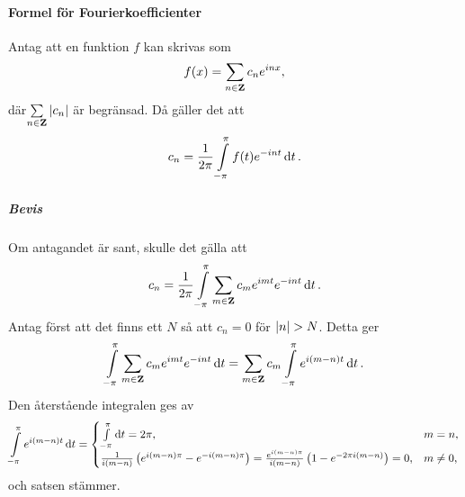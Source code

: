 \paragraph{Formel för Fourierkoefficienter}
Antag att en funktion $f$ kan skrivas som
\begin{align*}
	f(x) = \sum\limits_{n\in\mathbf{Z}}c_{n}e^{inx},
\end{align*}
där$\sum\limits_{n\in\mathbf{Z}}\abs{c_{n}}$ är begränsad. Då gäller det att
\begin{align*}
	c_{n} = \frac{1}{2\pi}\int\limits_{-\pi}^{\pi}f(t)e^{-int}\dd{t}.
\end{align*}

\subparagraph{Bevis}
Om antagandet är sant, skulle det gälla att
\begin{align*}
	c_{n} = \frac{1}{2\pi}\int\limits_{-\pi}^{\pi}\sum\limits_{m\in\mathbf{Z}}c_{m}e^{imt}e^{-int}\dd{t}.
\end{align*}
Antag först att det finns ett $N$ så att $c_{n} = 0$ för $\abs{n} > N$. Detta ger
\begin{align*}
	\int\limits_{-\pi}^{\pi}\sum\limits_{m\in\mathbf{Z}}c_{m}e^{imt}e^{-int}\dd{t} = \sum\limits_{m\in\mathbf{Z}}c_{m}\int\limits_{-\pi}^{\pi}e^{i(m - n)t}\dd{t}.
\end{align*}
Den återstående integralen ges av
\begin{align*}
	\int\limits_{-\pi}^{\pi}e^{i(m - n)t}\dd{t} =
	\begin{cases}
		\int\limits_{-\pi}^{\pi}\dd{t} = 2\pi,                                       &m = n, \\
		\frac{1}{i(m - n)}\left(e^{i(m - n)\pi} - e^{-i(m - n)\pi}\right) = \frac{e^{i(m - n)\pi}}{i(m - n)}\left(1 - e^{-2\pi i(m - n)}\right) = 0, &m\neq 0,
	\end{cases}
\end{align*}
och satsen stämmer.

